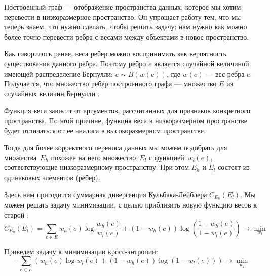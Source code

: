 Построенный граф --- отображение пространства данных, которое мы хотим перевести в низкоразмерное пространство. Он упрощает работу тем, что мы теперь знаем, что нужно сделать, чтобы решить задачу: нам нужно как можно более точно перевести ребра с весами между объектами в новое пространство.

Как говорилось ранее, веса ребер можно воспринимать как вероятность существования данного ребра. Поэтому ребро $e$ является случайной величиной, имеющей распределение Бернулли: $e \sim B(w(e))$, где $w(e)$ --- вес ребра $e$. Получается, что множество ребер построенного графа --- множество $E$ из случайных величин Бернулли \cite{umap}.

Функция веса зависит от аргументов, рассчитанных для признаков конкретного пространства. По этой причине, функция веса в низкоразмерном пространстве будет отличаться от ее аналога в высокоразмерном пространстве.

Тогда для более корректного переноса данных мы можем подобрать для множества~$E_h$ похожее на него множество~$E_l$ с функцией~$w_l(e)$, соответствующие низкоразмерному пространству. При этом $E_h$ и $E_l$ состоят из одинаковых элементов (ребер). 

Здесь нам пригодится суммарная дивергенция Кульбака-Лейблера $C_{E_h}(E_l)$. Мы можем решать задачу минимизации, с целью приблизить новую функцию весов к старой \cite{umap}:
\begin{equation}
	C_{E_h}(E_l) = \sum_{e \in E} w_h(e) \log \frac{w_h(e)}{w_l(e)} + (1 - w_h(e)) \log \left(\frac{1 - w_h(e)}{1 - w_l(e)}\right) \rightarrow \min_{w_l}
\end{equation}

Приведем задачу к минимизации кросс-энтропии:
\begin{equation}
	-\sum_{e \in E} \left(w_h(e)\log w_l(e) + (1 - w_h(e))\log (1 - w_l(e))\right) \rightarrow \min_{w_l}
\end{equation}

